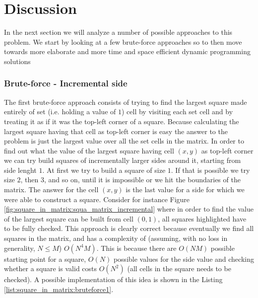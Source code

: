 \section{Discussion}
\label{square_in_matrix:sec:discussion}
In the next section we will analyze a number of possible approaches to this problem. We start by
looking at a few brute-force approaches so to then move towards more elaborate and more time and
space efficient dynamic programming solutions

\subsubsection{Brute-force - Incremental side}
\label{square_in_matrix:sec:incremental_side}
The first brute-force approach consists of trying to find the largest square made entirely of set
(i.e. holding a value of $1$) cell by visiting each set cell and by treating it as if it was the
top-left corner of a square. Because calculating the largest square having that cell as top-left
corner is easy the answer to the problem is just the largest value over all the set cells in the matrix.
In order to find out what the value of the largest square having cell $(x,y)$ as top-left corner we
can try build squares of incrementally larger sides around it, starting from side lenght $1$. At
first we try to build a square of size $1$. If that is possible we try size $2$, then $3$, and so
on, until it is impossible or we hit the boundaries of the matrix. The answer for the cell $(x,y)$
is the last value for a side for which we were able to construct a square.
Consider for instance Figure \ref{fig:square_in_matrix:squa_matrix_incremental}
where in order to find the value of the largest square can be built from cell
$(0,1)$, all squares highlighted have to be fully checked.
This approach is clearly correct because eventually we find all squares in the matrix, and
has a complexity of (assuming, with no loss in generality, $N \leq M$) $O(N^4M)$. This is because
there are $O(NM)$ possible starting point for a square, $O(N)$ possible values
for the side value and checking whether a square is valid costs $O(N^2)$ (all cells in the square needs to be
checked). A possible implementation of this idea
is shown in the Listing \ref{list:square_in_matrix:bruteforce1}.




